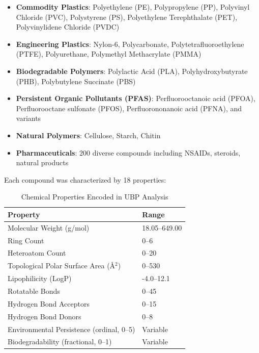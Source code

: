 \documentclass[11pt,letterpaper]{article}
\begin{document}
\begin{itemize}
    \item \textbf{Commodity Plastics}: Polyethylene (PE), Polypropylene (PP), Polyvinyl Chloride (PVC), Polystyrene (PS), Polyethylene Terephthalate (PET), Polyvinylidene Chloride (PVDC)
    
    \item \textbf{Engineering Plastics}: Nylon-6, Polycarbonate, Polytetrafluoroethylene (PTFE), Polyurethane, Polymethyl Methacrylate (PMMA)
    
    \item \textbf{Biodegradable Polymers}: Polylactic Acid (PLA), Polyhydroxybutyrate (PHB), Polybutylene Succinate (PBS)
    
    \item \textbf{Persistent Organic Pollutants (PFAS)}: Perfluorooctanoic acid (PFOA), Perfluorooctane sulfonate (PFOS), Perfluorononanoic acid (PFNA), and variants
    
    \item \textbf{Natural Polymers}: Cellulose, Starch, Chitin
    
    \item \textbf{Pharmaceuticals}: 200 diverse compounds including NSAIDs, steroids, natural products
\end{itemize}

Each compound was characterized by 18 properties:

\begin{table}[H]
\centering
\caption{Chemical Properties Encoded in UBP Analysis}
\begin{tabular}{ll}
\toprule
\textbf{Property} & \textbf{Range} \\
\midrule
Molecular Weight (g/mol) & 18.05--649.00 \\
Ring Count & 0--6 \\
Heteroatom Count & 0--20 \\
Topological Polar Surface Area (\AA$^2$) & 0--530 \\
Lipophilicity (LogP) & -4.0--12.1 \\
Rotatable Bonds & 0--45 \\
Hydrogen Bond Acceptors & 0--15 \\
Hydrogen Bond Donors & 0--8 \\
Environmental Persistence (ordinal, 0--5) & Variable \\
Biodegradability (fractional, 0--1) & Variable \\
\bottomrule
\end{tabular}
\end{table}
\end{document}
